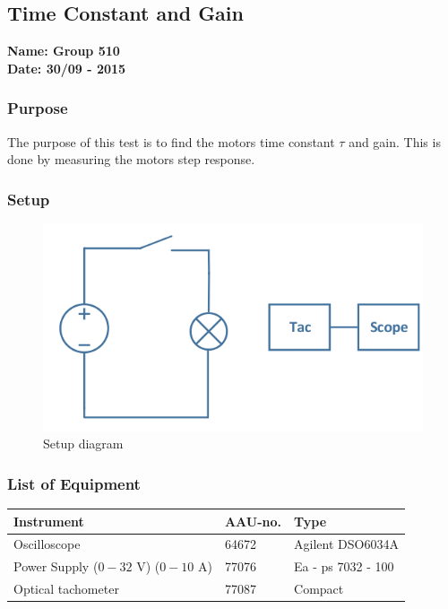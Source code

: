 \pagebreak
\subsection{Time Constant and Gain} %
\textbf{Name: Group 510}\\
\textbf{Date: 30/09 - 2015}

\subsubsection{Purpose}
The purpose of this test is to find the motors time constant $\tau$ and gain. This is done by measuring the motors step response.

\subsubsection{Setup}
\begin{figure}[H]
  \centering
	\includegraphics[scale=0.5]{figures/MotorTest8.png}
	\caption{Setup diagram}
\end{figure}

\subsubsection{List of Equipment}

\begin{table}[H]
\begin{tabular}{|l|l|p{4cm}|}
\hline%
  \textbf{Instrument}                        &  \textbf{AAU-no.}  &  \textbf{Type}       \\
\hline%
  Oscilloscope                               &  64672             &  Agilent DSO6034A    \\
\hline%
  Power Supply ($0 - 32$ V) ($0 - 10$ A)     &  77076             &  Ea - ps 7032 - 100  \\
\hline%
  Optical tachometer                         &  77087             &  Compact             \\
\hline%
\end{tabular}
\end{table}

